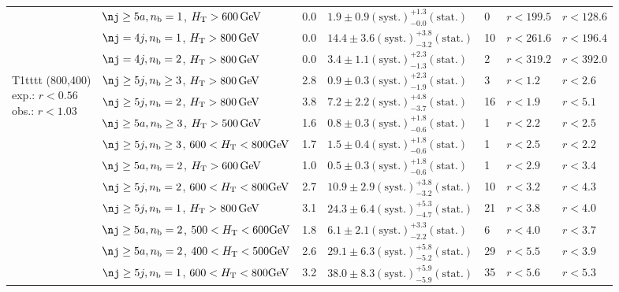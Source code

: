 \begin{table}[h!]
\begin{tabular}{ lllllll }
 & $\nj \geq5a,\nb =1$, $H_{\mathrm{T}} > 600 \, \mathrm{GeV}$ & 0.0 & $1.9 \pm 0.9 \mathrm{(syst.)} ^{+1.3}_{-0.0} \mathrm{(stat.)}$ & 0 & $r < 199.5$ & $r < 128.6$\\ 
 & $\nj =4j,\nb =1$, $H_{\mathrm{T}} > 800 \, \mathrm{GeV}$ & 0.0 & $14.4 \pm 3.6 \mathrm{(syst.)} ^{+3.8}_{-3.2} \mathrm{(stat.)}$ & 10 & $r < 261.6$ & $r < 196.4$\\ 
 & $\nj =4j,\nb =2$, $H_{\mathrm{T}} > 800 \, \mathrm{GeV}$ & 0.0 & $3.4 \pm 1.1 \mathrm{(syst.)} ^{+2.3}_{-1.3} \mathrm{(stat.)}$ & 2 & $r < 319.2$ & $r < 392.0$\\ \hline
\multirow{10}{*}{\parbox[t]{2cm}{T1tttt (800,400)\\exp.: $r<0.56$\\obs.: $r<1.03$}}
 & $\nj \geq5j,\nb \geq3$, $H_{\mathrm{T}} > 800 \, \mathrm{GeV}$ & 2.8 & $0.9 \pm 0.3 \mathrm{(syst.)} ^{+2.3}_{-1.9} \mathrm{(stat.)}$ & 3 & $r < 1.2$ & $r < 2.6$\\ 
 & $\nj \geq5j,\nb =2$, $H_{\mathrm{T}} > 800 \, \mathrm{GeV}$ & 3.8 & $7.2 \pm 2.2 \mathrm{(syst.)} ^{+4.8}_{-3.7} \mathrm{(stat.)}$ & 16 & $r < 1.9$ & $r < 5.1$\\ 
 & $\nj \geq5a,\nb \geq3$, $H_{\mathrm{T}} > 500 \, \mathrm{GeV}$ & 1.6 & $0.8 \pm 0.3 \mathrm{(syst.)} ^{+1.8}_{-0.6} \mathrm{(stat.)}$ & 1 & $r < 2.2$ & $r < 2.5$\\ 
 & $\nj \geq5j,\nb \geq3$, $600 < H_{\mathrm{T}} < 800 \mathrm{GeV}$ & 1.7 & $1.5 \pm 0.4 \mathrm{(syst.)} ^{+1.8}_{-0.6} \mathrm{(stat.)}$ & 1 & $r < 2.5$ & $r < 2.2$\\ 
 & $\nj \geq5a,\nb =2$, $H_{\mathrm{T}} > 600 \, \mathrm{GeV}$ & 1.0 & $0.5 \pm 0.3 \mathrm{(syst.)} ^{+1.8}_{-0.6} \mathrm{(stat.)}$ & 1 & $r < 2.9$ & $r < 3.4$\\ 
 & $\nj \geq5j,\nb =2$, $600 < H_{\mathrm{T}} < 800 \mathrm{GeV}$ & 2.7 & $10.9 \pm 2.9 \mathrm{(syst.)} ^{+3.8}_{-3.2} \mathrm{(stat.)}$ & 10 & $r < 3.2$ & $r < 4.3$\\ 
 & $\nj \geq5j,\nb =1$, $H_{\mathrm{T}} > 800 \, \mathrm{GeV}$ & 3.1 & $24.3 \pm 6.4 \mathrm{(syst.)} ^{+5.3}_{-4.7} \mathrm{(stat.)}$ & 21 & $r < 3.8$ & $r < 4.0$\\ 
 & $\nj \geq5a,\nb =2$, $500 < H_{\mathrm{T}} < 600 \mathrm{GeV}$ & 1.8 & $6.1 \pm 2.1 \mathrm{(syst.)} ^{+3.3}_{-2.2} \mathrm{(stat.)}$ & 6 & $r < 4.0$ & $r < 3.7$\\ 
 & $\nj \geq5a,\nb =2$, $400 < H_{\mathrm{T}} < 500 \mathrm{GeV}$ & 2.6 & $29.1 \pm 6.3 \mathrm{(syst.)} ^{+5.8}_{-5.2} \mathrm{(stat.)}$ & 29 & $r < 5.5$ & $r < 3.9$\\ 
 & $\nj \geq5j,\nb =1$, $600 < H_{\mathrm{T}} < 800 \mathrm{GeV}$ & 3.2 & $38.0 \pm 8.3 \mathrm{(syst.)} ^{+5.9}_{-5.9} \mathrm{(stat.)}$ & 35 & $r < 5.6$ & $r < 5.3$\\ \hline
    \hline
  \end{tabular}
\end{table}



